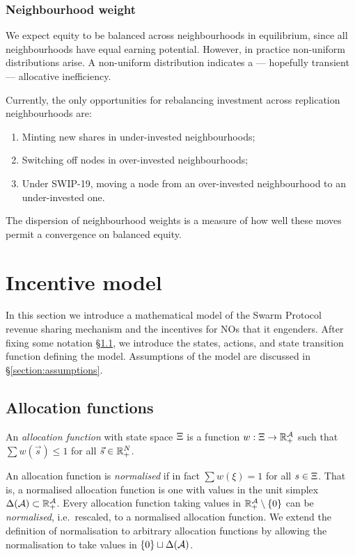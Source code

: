 \subsubsection{Neighbourhood weight}

We expect equity to be balanced across neighbourhoods in equilibrium, since all neighbourhoods have equal earning potential.
%
However, in practice non-uniform distributions arise.
%
A non-uniform distribution indicates a --- hopefully transient --- allocative inefficiency.

Currently, the only opportunities for rebalancing investment across replication neighbourhoods are:
\begin{enumerate}
  \item Minting new shares in under-invested neighbourhoods;
  \item Switching off nodes in over-invested neighbourhoods;
  \item Under SWIP-19, moving a node from an over-invested neighbourhood to an under-invested one.
\end{enumerate}
%
The dispersion of neighbourhood weights is a measure of how well these moves permit a convergence on balanced equity.



\section{Incentive model}
\label{section:model}

In this section we introduce a mathematical model of the Swarm Protocol revenue sharing mechanism and the incentives for NOs that it engenders.
%
After fixing some notation \S\ref{section:preliminaries}, we introduce the states, actions, and state transition function defining the model.
%
Assumptions of the model are discussed in \S\ref{section:assumptions}.


\subsection{Allocation functions}
\label{section:preliminaries}

\begin{definition}
  \label{def:allocation}

  An \emph{allocation function} with state space $\Xi$ is a function $w:\Xi\rightarrow\mathbb{R}_+^{\mathcal{A}}$ such that $\sum w(\vec{s}) \leq 1$ for all $\vec{s}\in \mathbb{R}_+^N$.
  
  An allocation function is \emph{normalised} if in fact $\sum w(\xi) = 1$ for all $s\in \Xi$.
  That is, a normalised allocation function is one with values in the unit simplex $\Delta(\mathcal{A})\subset\mathbb{R}_+^{\mathcal{A}}$.
  Every allocation function taking values in $\mathbb{R}_+^{\mathcal{A}}\setminus\{0\}$ can be \emph{normalised}, i.e.~rescaled, to a normalised allocation function.
  We extend the definition of normalisation to arbitrary allocation functions by allowing the normalisation to take values in $\{0\}\sqcup \Delta(\mathcal{A})$.

\end{definition}

